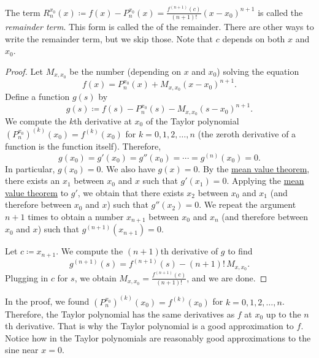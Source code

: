 The term $R_n^{x_0}(x)\coloneqq
f(x)-P_n^{x_0}(x) =
\frac{f^{(n+1)}(c)}{(n+1)!}{(x-x_0)}^{n+1}$ is called the
\emph{remainder term}.  This
form is called the
\emph{} of the remainder.  There are other ways
to write the remainder term, but we skip those.  Note that $c$ depends on
both $x$ and $x_0$.

\begin{proof}
Let $M_{x,x_0}$ be the number (depending on $x$ and $x_0$) solving the equation
\begin{equation*}
f(x)=P_{n}^{x_0}(x)+M_{x,x_0}{(x-x_0)}^{n+1} .
\end{equation*}
Define a function $g(s)$ by
\begin{equation*}
g(s) \coloneqq f(s)-P_n^{x_0}(s)-M_{x,x_0}{(s-x_0)}^{n+1} .
\end{equation*}
We compute
the $k$th derivative at $x_0$ of the Taylor polynomial
${(P_n^{x_0})}^{(k)}(x_0) = f^{(k)}(x_0)$ for
$k=0,1,2,\ldots,n$ (the zeroth derivative of a function is the function
itself).  Therefore,
\begin{equation*}
g(x_0) = g'(x_0) = g''(x_0) = \cdots = g^{(n)}(x_0) = 0 .
\end{equation*}
In particular, $g(x_0) = 0$.
We also have $g(x) = 0$.
By the
\hyperref[thm:mvt]{mean value theorem},
there exists an $x_1$ between $x_0$ and $x$ such that $g'(x_1) = 0$.
Applying the \hyperref[thm:mvt]{mean value theorem}
to $g'$, we obtain that there exists
$x_2$ between $x_0$ and $x_1$ (and therefore between $x_0$ and $x$)
such that $g''(x_2) = 0$.  We repeat the
argument $n+1$ times to obtain a number $x_{n+1}$ between $x_0$ and $x_n$
(and therefore between $x_0$ and $x$) such that $g^{(n+1)}(x_{n+1}) = 0$.

Let $c \coloneqq x_{n+1}$.
We compute the $(n+1)$th derivative of $g$ to find
\begin{equation*}
g^{(n+1)}(s) = f^{(n+1)}(s)-(n+1)!\,M_{x,x_0} .
\end{equation*}
Plugging in $c$ for $s$, we obtain $M_{x,x_0} = \frac{f^{(n+1)}(c)}{(n+1)!}$, and
we are done.
\end{proof}

In the proof, we found
${(P_n^{x_0})}^{(k)}(x_0) = f^{(k)}(x_0)$ for $k=0,1,2,\ldots,n$.
Therefore, the Taylor polynomial has the same derivatives as $f$ at $x_0$
up to the $n$th derivative.  That is why the Taylor polynomial is
a good approximation to $f$.
Notice how in  the Taylor polynomials are
reasonably good approximations to the sine near $x=0$.

